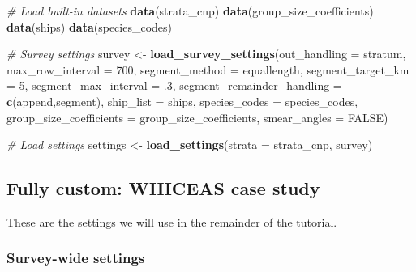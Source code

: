 \documentclass[
]{book}
\newenvironment{Shaded}{\begin{snugshade}}{\end{snugshade}}
\newcommand{\AttributeTok}[1]{\textcolor[rgb]{0.13,0.29,0.53}{#1}}
\newcommand{\CommentTok}[1]{\textcolor[rgb]{0.56,0.35,0.01}{\textit{#1}}}
\newcommand{\ConstantTok}[1]{\textcolor[rgb]{0.56,0.35,0.01}{#1}}
\newcommand{\DecValTok}[1]{\textcolor[rgb]{0.00,0.00,0.81}{#1}}
\newcommand{\FunctionTok}[1]{\textcolor[rgb]{0.13,0.29,0.53}{\textbf{#1}}}
\newcommand{\NormalTok}[1]{#1}
\newcommand{\OtherTok}[1]{\textcolor[rgb]{0.56,0.35,0.01}{#1}}
\newcommand{\StringTok}[1]{\textcolor[rgb]{0.31,0.60,0.02}{#1}}
\begin{document}
\begin{Shaded}
\begin{Highlighting}[]
\CommentTok{\# Load built{-}in datasets}
\FunctionTok{data}\NormalTok{(strata\_cnp)}
\FunctionTok{data}\NormalTok{(group\_size\_coefficients)}
\FunctionTok{data}\NormalTok{(ships)}
\FunctionTok{data}\NormalTok{(species\_codes)}

\CommentTok{\# Survey settings}
\NormalTok{survey }\OtherTok{\textless{}{-}} 
  \FunctionTok{load\_survey\_settings}\NormalTok{(}\AttributeTok{out\_handling =} \StringTok{\textquotesingle{}stratum\textquotesingle{}}\NormalTok{,}
                       \AttributeTok{max\_row\_interval =} \DecValTok{700}\NormalTok{,}
                       \AttributeTok{segment\_method =} \StringTok{\textquotesingle{}equallength\textquotesingle{}}\NormalTok{,}
                       \AttributeTok{segment\_target\_km =} \DecValTok{5}\NormalTok{,}
                       \AttributeTok{segment\_max\_interval =}\NormalTok{ .}\DecValTok{3}\NormalTok{,}
                       \AttributeTok{segment\_remainder\_handling =} \FunctionTok{c}\NormalTok{(}\StringTok{\textquotesingle{}append\textquotesingle{}}\NormalTok{,}\StringTok{\textquotesingle{}segment\textquotesingle{}}\NormalTok{),}
                       \AttributeTok{ship\_list =}\NormalTok{ ships,}
                       \AttributeTok{species\_codes =}\NormalTok{ species\_codes,}
                       \AttributeTok{group\_size\_coefficients =}\NormalTok{ group\_size\_coefficients,}
                       \AttributeTok{smear\_angles =} \ConstantTok{FALSE}\NormalTok{)}

\CommentTok{\# Load settings}
\NormalTok{settings }\OtherTok{\textless{}{-}} \FunctionTok{load\_settings}\NormalTok{(}\AttributeTok{strata =}\NormalTok{ strata\_cnp,}
\NormalTok{                          survey)}
\end{Highlighting}
\end{Shaded}

\hypertarget{fully-custom-whiceas-case-study}{%
\subsection*{Fully custom: WHICEAS case study}\label{fully-custom-whiceas-case-study}}

These are the settings we will use in the remainder of the tutorial.

\hypertarget{survey-wide-settings-1}{%
\subsubsection*{Survey-wide settings}\label{survey-wide-settings-1}}
\end{document}
